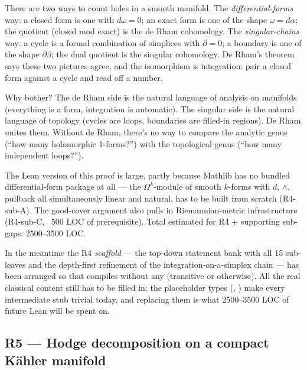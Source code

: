 \begin{layman}
There are two ways to count holes in a smooth manifold.  The
\emph{differential-forms} way: a closed form is one with
\(d\omega = 0\); an exact form is one of the shape \(\omega = d\alpha\);
the quotient (closed mod exact) is the de Rham cohomology.  The
\emph{singular-chains} way: a cycle is a formal combination of
simplices with \(\partial = 0\); a boundary is one of the shape
\(\partial \beta\); the dual quotient is the singular cohomology.
De Rham's theorem says these two pictures agree, and the
isomorphism is integration: pair a closed form against a cycle and
read off a number.

Why bother?  The de Rham side is the natural language of analysis on
manifolds (everything is a form, integration is automatic).  The
singular side is the natural language of topology (cycles are loops,
boundaries are filled-in regions).  De Rham unites them.  Without
de Rham, there's no way to compare the analytic genus
(``how many holomorphic 1-forms?'') with the topological genus
(``how many independent loops?'').

The Lean version of this proof is large, partly because Mathlib has
no bundled differential-form package at all --- the
\(\Omega^k\)-module of smooth \(k\)-forms with \(d\), \(\wedge\),
pullback all simultaneously linear and natural, has to be built from
scratch (R4-sub-A).  The good-cover argument also pulls in
Riemannian-metric infrastructure (R4-sub-C, ~500 LOC of
prerequisite).  Total estimated for R4 + supporting sub-gaps:
2500--3500 LOC.

In the meantime the R4 \emph{scaffold} --- the
top-down statement bank with all 15 sub-leaves and the
depth-first refinement of the integration-on-a-simplex chain --- has been
arranged so that  compiles
without any  (transitive or otherwise).  All the real
classical content still has to be filled in; the placeholder types
(, ) make every
intermediate stub trivial today, and replacing them is what
2500--3500 LOC of future Lean will be spent on.
\end{layman}

\subsection{R5 --- Hodge decomposition on a compact K\"ahler manifold}
\label{subsec:gap-R5-hodge}

